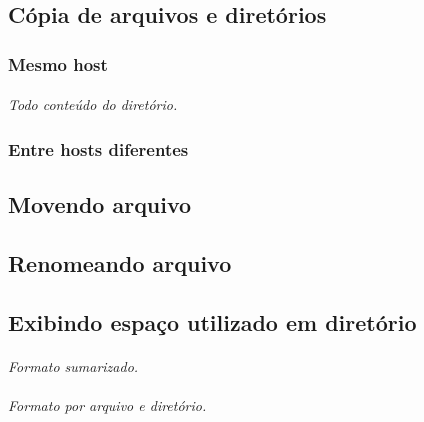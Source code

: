 \documentclass[a4paper,9pt]{extarticle}
\begin{document}
\begin{multicols}{2}
\subsection{Cópia de arquivos e diretórios} 
\subsubsection{Mesmo host}
	
	\paragraph{}
	\paragraph{} \emph{Todo conteúdo do diretório.} 
	
\subsubsection{Entre hosts diferentes}
	

\subsection{Movendo arquivo} 


\subsection{Renomeando arquivo}

 	

\subsection{Exibindo espaço utilizado em diretório}
	
	\paragraph{} \emph{Formato sumarizado.}
	\paragraph{} \emph{Formato por arquivo e diretório.}
	

\end{multicols}
\end{document}
